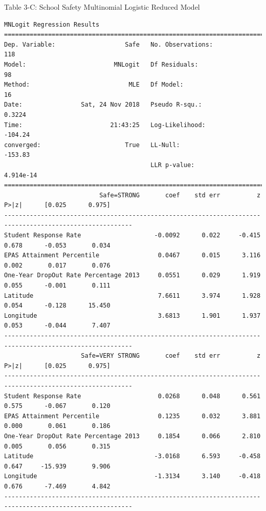 \documentclass[11pt]{article}
\newcommand{\1}{\mathds{1}}
\begin{document}
\newpage
\noindent
Table 3-C: School Safety Multinomial Logistic Reduced Model
\begin{Verbatim}[fontsize=\tiny]
MNLogit Regression Results                          
==============================================================================
Dep. Variable:                   Safe   No. Observations:                  118
Model:                        MNLogit   Df Residuals:                       98
Method:                           MLE   Df Model:                           16
Date:                Sat, 24 Nov 2018   Pseudo R-squ.:                  0.3224
Time:                        21:43:25   Log-Likelihood:                -104.24
converged:                       True   LL-Null:                       -153.83
                                        LLR p-value:                 4.914e-14
=========================================================================================================
                          Safe=STRONG       coef    std err          z      P>|z|      [0.025      0.975]
---------------------------------------------------------------------------------------------------------
Student Response Rate                    -0.0092      0.022     -0.415      0.678      -0.053       0.034
EPAS Attainment Percentile                0.0467      0.015      3.116      0.002       0.017       0.076
One-Year DropOut Rate Percentage 2013     0.0551      0.029      1.919      0.055      -0.001       0.111
Latitude                                  7.6611      3.974      1.928      0.054      -0.128      15.450
Longitude                                 3.6813      1.901      1.937      0.053      -0.044       7.407
---------------------------------------------------------------------------------------------------------
                     Safe=VERY STRONG       coef    std err          z      P>|z|      [0.025      0.975]
---------------------------------------------------------------------------------------------------------
Student Response Rate                     0.0268      0.048      0.561      0.575      -0.067       0.120
EPAS Attainment Percentile                0.1235      0.032      3.881      0.000       0.061       0.186
One-Year DropOut Rate Percentage 2013     0.1854      0.066      2.810      0.005       0.056       0.315
Latitude                                 -3.0168      6.593     -0.458      0.647     -15.939       9.906
Longitude                                -1.3134      3.140     -0.418      0.676      -7.469       4.842
---------------------------------------------------------------------------------------------------------

\end{Verbatim}
\end{document}
